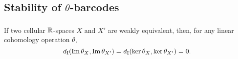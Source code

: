 \subsection{Stability of $\theta$-barcodes}\label{ss:stability}




%
%

\subsubsection{}\label{lem:w.h.e. preservance}
\lemma If two cellular $\mathbb{R}$-spaces $X$ and $X'$ are weakly equivalent, then, for any linear cohomology operation $\theta$,
\[
d_{\mathrm{I}}(\operatorname{Im}\theta_{X},\operatorname{Im}\theta_{X'}) = d_{\mathrm{I}}(\ker\theta_{X}, \ker\theta_{X'}) = 0.
\]

